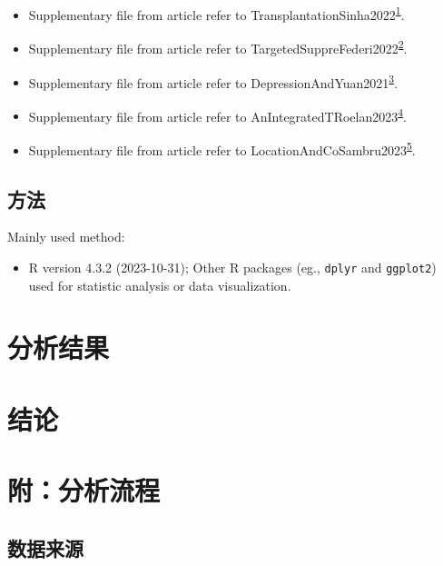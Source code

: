 \documentclass[
]{article}
\providecommand{\tightlist}{%
  \setlength{\itemsep}{0pt}\setlength{\parskip}{0pt}}
\begin{document}
\begin{itemize}
\tightlist
\item
  Supplementary file from article refer to TransplantationSinha2022\textsuperscript{\protect\hyperlink{ref-TransplantationSinha2022}{1}}.
\item
  Supplementary file from article refer to TargetedSuppreFederi2022\textsuperscript{\protect\hyperlink{ref-TargetedSuppreFederi2022}{2}}.
\item
  Supplementary file from article refer to DepressionAndYuan2021\textsuperscript{\protect\hyperlink{ref-DepressionAndYuan2021}{3}}.
\item
  Supplementary file from article refer to AnIntegratedTRoelan2023\textsuperscript{\protect\hyperlink{ref-AnIntegratedTRoelan2023}{4}}.
\item
  Supplementary file from article refer to LocationAndCoSambru2023\textsuperscript{\protect\hyperlink{ref-LocationAndCoSambru2023}{5}}.
\end{itemize}

\hypertarget{ux65b9ux6cd5}{%
\subsection{方法}\label{ux65b9ux6cd5}}

Mainly used method:

\begin{itemize}
\tightlist
\item
  R version 4.3.2 (2023-10-31); Other R packages (eg., \texttt{dplyr} and \texttt{ggplot2}) used for statistic analysis or data visualization.
\end{itemize}

\hypertarget{results}{%
\section{分析结果}\label{results}}

\hypertarget{dis}{%
\section{结论}\label{dis}}

\hypertarget{workflow}{%
\section{附：分析流程}\label{workflow}}

\hypertarget{ux6570ux636eux6765ux6e90}{%
\subsection{数据来源}\label{ux6570ux636eux6765ux6e90}}
\end{document}
